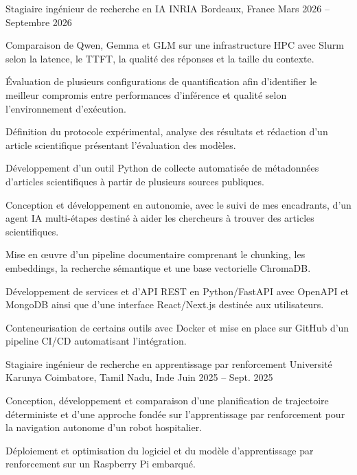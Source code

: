 
\begin{cventries}
  \cventry
    {Stagiaire ingénieur de recherche en IA}
    {INRIA}
    {Bordeaux, France}
    {Mars 2026 -- Septembre 2026}
    {
      \begin{cvitems}
        \item {Comparaison de Qwen, Gemma et GLM sur une infrastructure HPC avec Slurm selon la latence, le TTFT, la qualité des réponses et la taille du contexte.}
        \item {Évaluation de plusieurs configurations de quantification afin d’identifier le meilleur compromis entre performances d’inférence et qualité selon l’environnement d’exécution.}
        \item {Définition du protocole expérimental, analyse des résultats et rédaction d’un article scientifique présentant l’évaluation des modèles.}
        \item {Développement d’un outil Python de collecte automatisée de métadonnées d’articles scientifiques à partir de plusieurs sources publiques.}
        \item {Conception et développement en autonomie, avec le suivi de mes encadrants, d’un agent IA multi-étapes destiné à aider les chercheurs à trouver des articles scientifiques.}
        \item {Mise en œuvre d’un pipeline documentaire comprenant le chunking, les embeddings, la recherche sémantique et une base vectorielle ChromaDB.}
        \item {Développement de services et d’API REST en Python/FastAPI avec OpenAPI et MongoDB ainsi que d’une interface React/Next.js destinée aux utilisateurs.}
        \item {Conteneurisation de certains outils avec Docker et mise en place sur GitHub d’un pipeline CI/CD automatisant l’intégration.}
      \end{cvitems}
    }

  \cventry
    {Stagiaire ingénieur de recherche en apprentissage par renforcement}
    {Université Karunya}
    {Coimbatore, Tamil Nadu, Inde}
    {Juin 2025 -- Sept. 2025}
    {
      \begin{cvitems}
        \item {Conception, développement et comparaison d’une planification de trajectoire déterministe et d’une approche fondée sur l’apprentissage par renforcement pour la navigation autonome d’un robot hospitalier.}
        \item {Déploiement et optimisation du logiciel et du modèle d’apprentissage par renforcement sur un Raspberry Pi embarqué.}
      \end{cvitems}
    }
\end{cventries}
